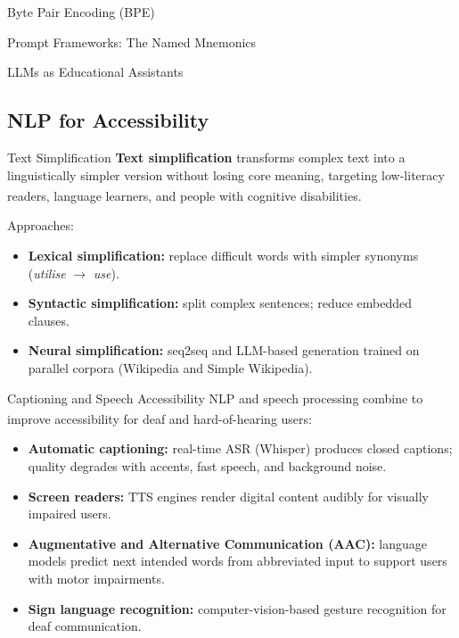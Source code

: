 \begin{v3topic}{Byte Pair Encoding (BPE)}
\begin{v3topic}{Prompt Frameworks: The Named Mnemonics}
\begin{v3topic}{LLMs as Educational Assistants}
\end{v3topic}

\subsection{NLP for Accessibility}


\begin{v3topic}{Text Simplification}
    \textbf{Text simplification} transforms complex text into a linguistically simpler
    version without losing core meaning, targeting low-literacy readers, language
    learners, and people with cognitive
    disabilities.\textsuperscript{\cite[][p.~11]{dhamaniIntroductionGenerativeAI2024}}

    Approaches:
    \begin{itemize}
        \item \textbf{Lexical simplification:} replace difficult words with simpler
              synonyms (\emph{utilise} $\to$ \emph{use}).
        \item \textbf{Syntactic simplification:} split complex sentences; reduce
              embedded clauses.
        \item \textbf{Neural simplification:} seq2seq and LLM-based generation trained
              on parallel corpora (Wikipedia and Simple Wikipedia).
    \end{itemize}

\end{v3topic}
\begin{v3topic}{Captioning and Speech Accessibility}
    NLP and speech processing combine to improve accessibility for deaf and hard-of-hearing
    users:\textsuperscript{\cite[][p.~11]{dhamaniIntroductionGenerativeAI2024}}

    \begin{itemize}
        \item \textbf{Automatic captioning:} real-time ASR (Whisper) produces closed
              captions; quality degrades with accents, fast speech, and background noise.
        \item \textbf{Screen readers:} TTS engines render digital content audibly for
              visually impaired users.
        \item \textbf{Augmentative and Alternative Communication (AAC):} language models
              predict next intended words from abbreviated input to support users with
              motor impairments.
        \item \textbf{Sign language recognition:} computer-vision-based gesture
              recognition for deaf communication.
    \end{itemize}


\end{v3topic}
\end{v3topic}
\end{v3topic}
